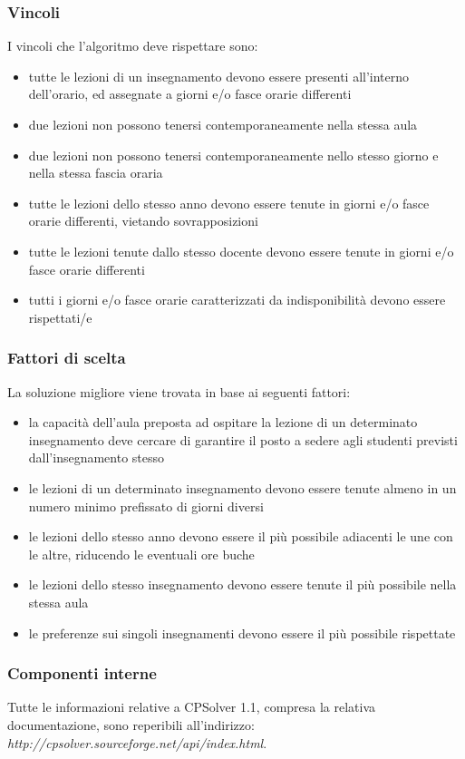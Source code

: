 \documentclass[11pt,a4paper]{article}
\begin{document}
\subsubsection*{Vincoli}
I vincoli che l'algoritmo deve rispettare sono:
\begin{itemize}
 \item tutte le lezioni di un insegnamento devono essere presenti all'interno dell'orario, ed assegnate a giorni e/o fasce orarie differenti
 \item due lezioni non possono tenersi contemporaneamente nella stessa aula
 \item due lezioni non possono tenersi contemporaneamente nello stesso giorno e nella stessa fascia oraria
 \item tutte le lezioni dello stesso anno devono essere tenute in giorni e/o fasce orarie differenti, vietando sovrapposizioni 
 \item tutte le lezioni tenute dallo stesso docente devono essere tenute in giorni e/o fasce orarie differenti
 \item tutti i giorni e/o fasce orarie caratterizzati da indisponibilità devono essere rispettati/e
\end{itemize}
\subsubsection*{Fattori di scelta}
La soluzione migliore viene trovata in base ai seguenti fattori:
\begin{itemize}
 \item la capacità dell'aula preposta ad ospitare la lezione di un determinato insegnamento deve cercare di garantire il posto a sedere agli studenti previsti dall'insegnamento stesso
 \item le lezioni di un determinato insegnamento devono essere tenute almeno in un numero minimo prefissato di giorni diversi
 \item le lezioni dello stesso anno devono essere il più possibile adiacenti le une con le altre, riducendo le eventuali ore buche
 \item le lezioni dello stesso insegnamento devono essere tenute il più possibile nella stessa aula
 \item le preferenze sui singoli insegnamenti devono essere il più possibile rispettate
\end{itemize}
\subsubsection*{Componenti interne}
Tutte le informazioni relative a CPSolver 1.1, compresa la relativa documentazione, sono reperibili all'indirizzo: \textit{http://cpsolver.sourceforge.net/api/index.html}.
\end{document}
